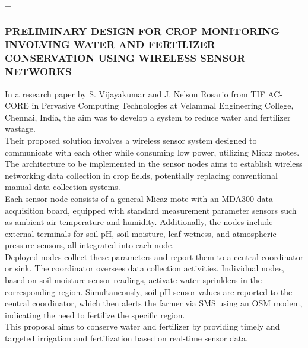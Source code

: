 =\documentclass[12pt, a4paper]{article}
\begin{document}
\subsubsection{PRELIMINARY DESIGN FOR CROP MONITORING INVOLVING WATER AND FERTILIZER CONSERVATION USING WIRELESS SENSOR NETWORKS}
In a research paper by S. Vijayakumar and J. Nelson Rosario \cite{vijayakumar2011preliminary} from TIF AC-CORE in Pervasive Computing Technologies at Velammal Engineering College, Chennai, India, the aim was to develop a system to reduce water and fertilizer wastage.\\
Their proposed solution involves a wireless sensor system designed to communicate with each other while consuming low power, utilizing Micaz motes. The architecture to be implemented in the sensor nodes aims to establish wireless networking data collection in crop fields, potentially replacing conventional manual data collection systems.\\
Each sensor node consists of a general Micaz mote with an MDA300 data acquisition board, equipped with standard measurement parameter sensors such as ambient air temperature and humidity. Additionally, the nodes include external terminals for soil pH, soil moisture, leaf wetness, and atmospheric pressure sensors, all integrated into each node.\\
Deployed nodes collect these parameters and report them to a central coordinator or sink. The coordinator oversees data collection activities. Individual nodes, based on soil moisture sensor readings, activate water sprinklers in the corresponding region. Simultaneously, soil pH sensor values are reported to the central coordinator, which then alerts the farmer via SMS using an OSM modem, indicating the need to fertilize the specific region.\\
This proposal aims to conserve water and fertilizer by providing timely and targeted irrigation and fertilization based on real-time sensor data.
\end{document}
